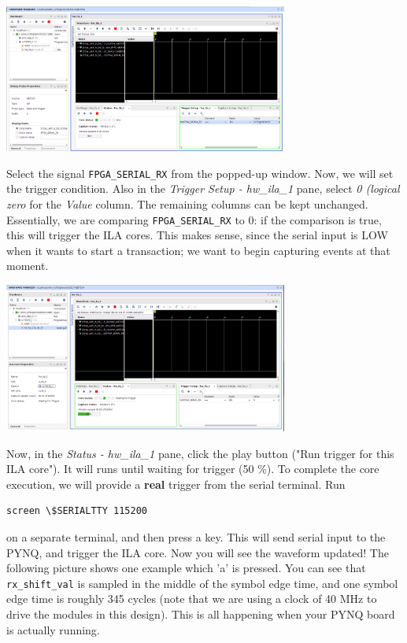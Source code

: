 \documentclass[11pt]{article}
\begin{document}
\begin{center}
\includegraphics[width=0.7\textwidth]{figs/vivado-ila-7.png}
\end{center}

Select the signal \verb|FPGA_SERIAL_RX| from the popped-up window. Now, we will set the trigger condition. Also in the \emph{Trigger Setup - hw\_ila\_1} pane, select \emph{0 (logical zero} for the \emph{Value} column. The remaining columns can be kept unchanged. Essentially, we are comparing \verb|FPGA_SERIAL_RX| to 0: if the comparison is true, this will trigger the ILA cores. This makes sense, since the serial input is LOW when it wants to start a transaction; we want to begin capturing events at that moment.

\begin{center}
\includegraphics[width=0.7\textwidth]{figs/vivado-ila-8.png}
\end{center}

Now, in the \emph{Status - hw\_ila\_1} pane, click the play button ("Run trigger for this ILA core"). It will runs until waiting for trigger (50 \%). To complete the core execution, we will provide a \textbf{real} trigger from the serial terminal. Run

\begin{verbatim}
screen \$SERIALTTY 115200
\end{verbatim}

on a separate terminal, and then press a key. This will send serial input to the PYNQ, and trigger the ILA core. Now you will see the waveform updated! The following picture shows one example which 'a' is pressed. You can see that \verb|rx_shift_val| is sampled in the middle of the symbol edge time, and one symbol edge time is roughly 345 cycles (note that we are using a clock of 40 MHz to drive the modules in this design). This is all happening when your PYNQ board is actually running.
\end{document}
